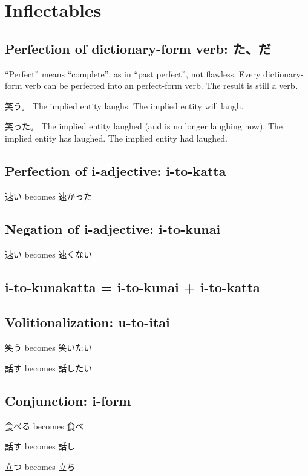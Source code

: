 \chapter{Inflectables}

\section{Perfection of dictionary-form verb: た、だ}

``Perfect'' means ``complete'', as in ``past perfect'', not flawless.
Every dictionary-form verb can be perfected into an perfect-form verb.
The result is still a verb.

笑う。
The implied entity laughs.
The implied entity will laugh.

笑った。
The implied entity laughed (and is no longer laughing now).
The implied entity has laughed.
The implied entity had laughed.

\section{Perfection of i-adjective: i-to-katta}

速い becomes 速かった

\section{Negation of i-adjective: i-to-kunai}

速い becomes 速くない

\section{i-to-kunakatta = i-to-kunai + i-to-katta}

\section{Volitionalization: u-to-itai}

笑う becomes 笑いたい

話す becomes 話したい

\section{Conjunction: i-form}

食べる becomes 食べ

話す becomes 話し

立つ becomes 立ち

